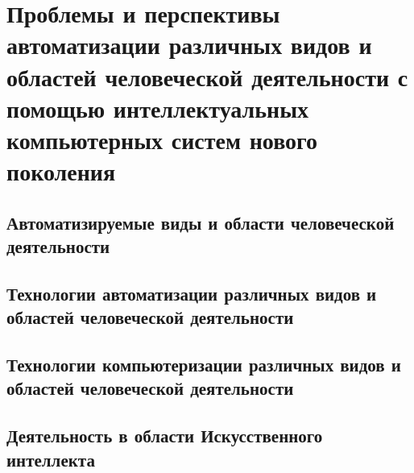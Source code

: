 \chapter{Проблемы и перспективы автоматизации различных видов и областей человеческой деятельности с помощью интеллектуальных компьютерных систем нового поколения}
\label{chapter_automation_perspectives}


\section{Автоматизируемые виды и области человеческой деятельности}
\section{Технологии автоматизации различных видов и областей человеческой деятельности}
\section{Технологии компьютеризации различных видов и областей человеческой деятельности}
\section{Деятельность в области Искусственного интеллекта}

%